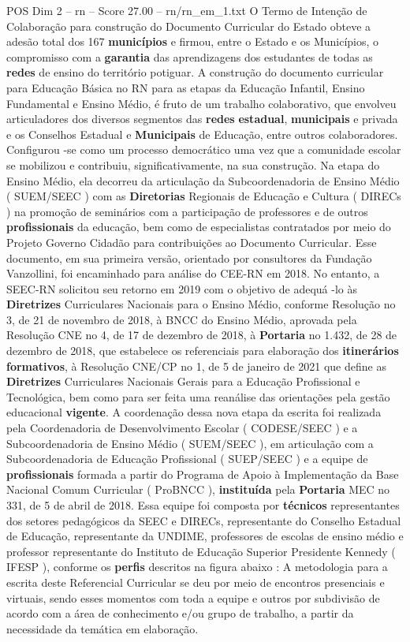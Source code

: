 \begin{textsample}{POS Dim 2 – rn – Score 27.00 – rn/rn\_em\_1.txt}
O Termo de Intenção de Colaboração para construção do Documento Curricular do Estado obteve a adesão total dos 167 \textbf{municípios} e firmou, entre o Estado e os Municípios, o compromisso com a \textbf{garantia} das aprendizagens dos estudantes de todas as \textbf{redes} de ensino do território potiguar.
A construção do documento curricular para Educação Básica no RN para as etapas da Educação Infantil, Ensino Fundamental e Ensino Médio, é fruto de um trabalho colaborativo, que envolveu articuladores dos diversos segmentos das \textbf{redes} \textbf{estadual}, \textbf{municipais} e privada e os Conselhos Estadual e \textbf{Municipais} de Educação, entre outros colaboradores.
Configurou -se como um processo democrático uma vez que a comunidade escolar se mobilizou e contribuiu, significativamente, na sua construção.
Na etapa do Ensino Médio, ela decorreu da articulação da Subcoordenadoria de Ensino Médio ( SUEM/SEEC ) com as \textbf{Diretorias} Regionais de Educação e Cultura ( DIRECs ) na promoção de seminários com a participação de professores e de outros \textbf{profissionais} da educação, bem como de especialistas contratados por meio do Projeto Governo Cidadão para contribuições ao Documento Curricular.
Esse documento, em sua primeira versão, orientado por consultores da Fundação Vanzollini, foi encaminhado para análise do CEE-RN em 2018.
No entanto, a SEEC-RN solicitou seu retorno em 2019 com o objetivo de adequá -lo às \textbf{Diretrizes} Curriculares Nacionais para o Ensino Médio, conforme Resolução no 3, de 21 de novembro de 2018, à BNCC do Ensino Médio, aprovada pela Resolução CNE no 4, de 17 de dezembro de 2018, à \textbf{Portaria} no 1.432, de 28 de dezembro de 2018, que estabelece os referenciais para elaboração dos \textbf{itinerários} \textbf{formativos}, à Resolução CNE/CP no 1, de 5 de janeiro de 2021 que define as \textbf{Diretrizes} Curriculares Nacionais Gerais para a Educação Profissional e Tecnológica, bem como para ser feita uma reanálise das orientações pela gestão educacional \textbf{vigente}.
A coordenação dessa nova etapa da escrita foi realizada pela Coordenadoria de Desenvolvimento Escolar ( CODESE/SEEC ) e a Subcoordenadoria de Ensino Médio ( SUEM/SEEC ), em articulação com a Subcoordenadoria de Educação Profissional ( SUEP/SEEC ) e a equipe de \textbf{profissionais} formada a partir do Programa de Apoio à Implementação da Base Nacional Comum Curricular ( ProBNCC ), \textbf{instituída} pela \textbf{Portaria} MEC no 331, de 5 de abril de 2018.
Essa equipe foi composta por \textbf{técnicos} representantes dos setores pedagógicos da SEEC e DIRECs, representante do Conselho Estadual de Educação, representante da UNDIME, professores de escolas de ensino médio e professor representante do Instituto de Educação Superior Presidente Kennedy ( IFESP ), conforme os \textbf{perfis} descritos na figura abaixo : A metodologia para a escrita deste Referencial Curricular se deu por meio de encontros presenciais e virtuais, sendo esses momentos com toda a equipe e outros por subdivisão de acordo com a área de conhecimento e/ou grupo de trabalho, a partir da necessidade da temática em elaboração.

\end{textsample}
